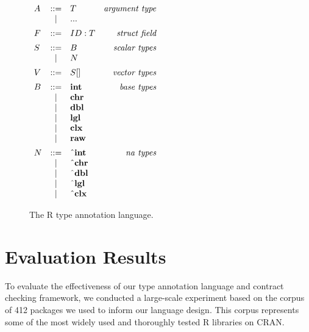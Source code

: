 \documentclass[acmsmall,review,anonymous]{acmart}\settopmatter{printfolios=true,printccs=false,printacmref=false}
\begin{document}
\begin{figure}
\begin{minipage}{.45\linewidth}
    \end{minipage}
    \hfill
    \begin{minipage}{.45\linewidth}
    \begin{flushright}
    $ \begin{array}{lclr}
    A & ::= & T & \text{\it argument type} \\
      & |   & {\bf ...} \vspace{5pt} \\
    F & ::= & ID : T & \text{\it struct field}\vspace{5pt}\\
    S & ::= & B & \text{\it scalar types} \\
      & |   & N \vspace{5pt}\\
    V & ::= & S \lbrack \rbrack & \text{\it vector types} \vspace{5pt}\\
    B & ::= & {\bf int} & \text{\it base types} \\
      & |   & {\bf chr} \\
      & |   & {\bf dbl} \\
      & |   & {\bf lgl} \\
      & |   & {\bf clx} \\
      & |   & {\bf raw} \vspace{5pt}\\
    N & ::= & {\bf \string^int} & \text{\it na types} \\
      & |   & {\bf \string^chr} \\
      & |   & {\bf \string^dbl} \\
      & |   & {\bf \string^lgl} \\
      & |   & {\bf \string^clx} \\
\end{array} $
    \end{flushright}
    \end{minipage}
    \caption{The R type annotation language.}
    \label{fig:types}
\end{figure}

%
%
%
%
%
%
\section{Evaluation Results}
\label{sec:evaluation}

To evaluate the effectiveness of our type annotation language and contract checking framework, we conducted a large-scale experiment based on the corpus of 412 packages we used to inform our language design.
This corpus represents some of the most widely used and thoroughly tested R libraries on CRAN.
\end{document}
